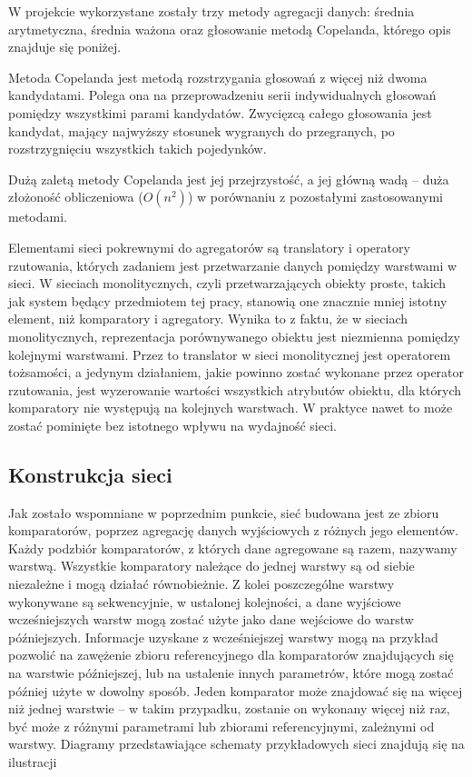 \documentclass{pracalicmgr}
\begin{document}
    W projekcie wykorzystane zostały trzy metody agregacji danych: średnia arytmetyczna, średnia ważona oraz głosowanie metodą Copelanda, którego opis znajduje się poniżej.
    \begin{defn}
        Metoda Copelanda jest metodą rozstrzygania głosowań z więcej niż dwoma kandydatami. Polega ona na przeprowadzeniu serii indywidualnych głosowań pomiędzy wszystkimi parami kandydatów. Zwycięzcą całego głosowania jest kandydat, mający najwyższy stosunek wygranych do przegranych, po rozstrzygnięciu wszystkich takich pojedynków.
    \end{defn}
    Dużą zaletą metody Copelanda jest jej przejrzystość, a jej główną wadą -- duża złożoność obliczeniowa ($O(n^2)$) w porównaniu z pozostałymi zastosowanymi metodami. 
    
    Elementami sieci pokrewnymi do agregatorów są translatory i operatory rzutowania, których zadaniem jest przetwarzanie danych pomiędzy warstwami w sieci. W sieciach monolitycznych, czyli przetwarzających obiekty proste, takich jak system będący przedmiotem tej pracy, stanowią one znacznie mniej istotny element, niż komparatory i agregatory. Wynika to z faktu, że w sieciach monolitycznych, reprezentacja porównywanego obiektu jest niezmienna pomiędzy kolejnymi warstwami. Przez to translator w sieci monolitycznej jest operatorem tożsamości, a jedynym działaniem, jakie powinno zostać wykonane przez operator rzutowania, jest wyzerowanie wartości wszystkich atrybutów obiektu, dla których komparatory nie występują na kolejnych warstwach. W praktyce nawet to może zostać pominięte bez istotnego wpływu na wydajność sieci.
    \subsection{Konstrukcja sieci}
    Jak zostało wspomniane w poprzednim punkcie, sieć budowana jest ze zbioru komparatorów, poprzez agregację danych wyjściowych z różnych jego elementów. Każdy podzbiór komparatorów, z których dane agregowane są razem, nazywamy warstwą. Wszystkie komparatory należące do jednej warstwy są od siebie niezależne i mogą działać równobieżnie. Z kolei poszczególne warstwy wykonywane są sekwencyjnie, w ustalonej kolejności, a dane wyjściowe wcześniejszych warstw mogą zostać użyte jako dane wejściowe do warstw późniejszych. Informacje uzyskane z wcześniejszej warstwy mogą na przykład pozwolić na zawężenie zbioru referencyjnego dla komparatorów znajdujących się na warstwie późniejszej, lub na ustalenie innych parametrów, które mogą zostać później użyte w dowolny sposób. Jeden komparator może znajdować się na więcej niż jednej warstwie -- w takim przypadku, zostanie on wykonany więcej niż raz, być może z różnymi parametrami lub zbiorami referencyjnymi, zależnymi od warstwy. Diagramy przedstawiające schematy przykładowych sieci znajdują się na ilustracji %
    
\end{document}
